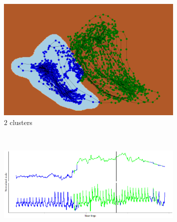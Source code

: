 \documentclass[runningheads]{llncs}
\begin{document}
\begin{figure}[H]
	\centering
	\begin{subfigure}[b]{0.35\textwidth}
		\includegraphics[width=\textwidth]{ex2_pca_cluster_2.PNG}
		\caption{\(2\) clusters}
		\label{fig:ex2_pca_cluster_2}
	\end{subfigure}
	~
	\begin{subfigure}[b]{0.6\textwidth}
		\includegraphics[width=\textwidth]{ex2_context_timeline_2.PNG}
		\label{fig:ex2_context_timeline_2}
	\end{subfigure}
	

\end{figure}
\end{document}
